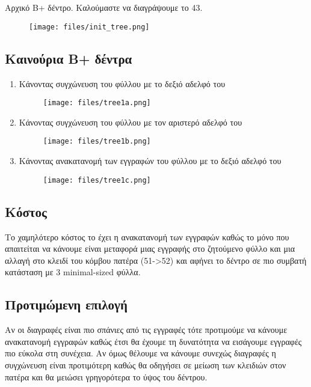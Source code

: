 \documentclass[a4paper,10pt]{article}
\begin{document}
\def\thesection {Άσκηση \arabic{section}}
\def\thesubsection {\roman{subsection})}
\def\thesubsubsection {(\arabic{subsubsection})}
\renewcommand{\labelenumi}{(\arabic{enumi})}
\renewcommand{\labelenumii}{(\arabic{enumii})}

\section{}
\noindent Αρχικό B+ δέντρο. Καλούμαστε να διαγράψουμε το 43.
\begin{figure}[h]
	\centering
	\texttt{[image: files/init\_tree.png]}
\end{figure}

\subsection{Καινούρια B+ δέντρα}
		\begin{enumerate}
			\item
				Κάνοντας συγχώνευση του φύλλου με το δεξιό αδελφό του
				\begin{figure}[H]
					\centering
					\texttt{[image: files/tree1a.png]}
				\end{figure}
				\pagebreak
			\item
				Κάνοντας συγχώνευση του φύλλου με τον αριστερό αδελφό του
				\begin{figure}[H]
					\centering
					\texttt{[image: files/tree1b.png]}
				\end{figure}
			\item
				Κάνοντας ανακατανομή των εγγραφών του φύλλου με το δεξιό αδελφό του
				\begin{figure}[H]
					\centering
					\texttt{[image: files/tree1c.png]}
				\end{figure}
		\end{enumerate}
\subsection{Κόστος}
Το χαμηλότερο κόστος το έχει η ανακατανομή των εγγραφών καθώς το μόνο που
απαιτείται να κάνουμε είναι μεταφορά μιας εγγραφής στο ζητούμενο φύλλο και μια
αλλαγή στο κλειδί του κόμβου πατέρα (51->52) και αφήνει το δέντρο σε πιο
συμβατή κατάσταση με 3 minimal-sized φύλλα.
\subsection{Προτιμώμενη επιλογή}
Αν οι διαγραφές είναι πιο σπάνιες από τις εγγραφές τότε προτιμούμε να κάνουμε
ανακατανομή εγγραφών καθώς έτσι θα έχουμε τη δυνατότητα να εισάγουμε εγγραφές
πιο εύκολα στη συνέχεια. Αν όμως θέλουμε να κάνουμε συνεχώς διαγραφές η
συγχώνευση είναι προτιμότερη καθώς θα οδηγήσει σε μείωση των κλειδιών στον
πατέρα και θα μειώσει γρηγορότερα το ύψος του δέντρου.
\pagebreak
\end{document}
